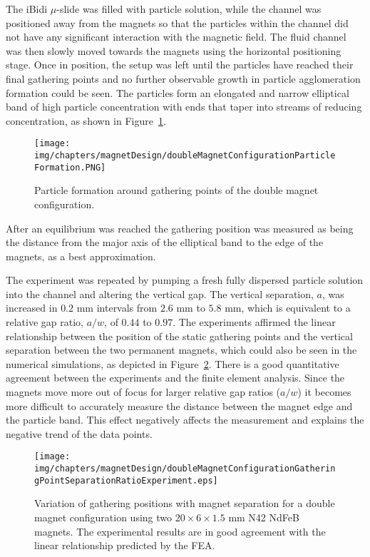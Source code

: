 The iBidi $\mu$-slide was filled with particle solution, while the channel was positioned away from the magnets so that the particles within the channel did not have any significant interaction with the magnetic field. The fluid channel was then slowly moved towards the magnets using the horizontal positioning stage. Once in position, the setup was left until the particles have reached their final gathering points and no further observable growth in particle agglomeration formation could be seen. The particles form an elongated and narrow elliptical band of high particle concentration with ends that taper into streams of reducing concentration, as shown in Figure~\ref{fig:doubleMagnetConfigurationParticleFormation}.

\begin{figure}[htb]%
\centering
	\texttt{[image: img/chapters/magnetDesign/doubleMagnetConfigurationParticleFormation.PNG]}
\caption[Particle formation around gathering points]{Particle formation around gathering points of the double magnet configuration.}
\label{fig:doubleMagnetConfigurationParticleFormation}
\end{figure}

After an equilibrium was reached the gathering position was measured as being the distance from the major axis of the elliptical band to the edge of the magnets, as a best approximation.

The experiment was repeated by pumping a fresh fully dispersed particle solution into the channel and altering the vertical gap. The vertical separation, $a$, was increased in $0.2$ mm intervals from $2.6$ mm to $5.8$ mm, which is equivalent to a relative gap ratio, $a/w$, of $0.44$ to $0.97$. The experiments affirmed the linear relationship between the position of the static gathering points and the vertical separation between the two permanent magnets, which could also be seen in the numerical simulations, as depicted in Figure~\ref{fig:doubleMagnetConfigurationGatheringPointSeparationRatioExperiment}. There is a good quantitative agreement between the experiments and the finite element analysis. Since the magnets move more out of focus for larger relative gap ratios ($a/w$) it becomes more difficult to accurately measure the distance between the magnet edge and the particle band. This effect negatively affects the measurement and explains the negative trend of the data points. 

\begin{figure}[htb]%
\centering
	\texttt{[image: img/chapters/magnetDesign/doubleMagnetConfigurationGatheringPointSeparationRatioExperiment.eps]}
\caption[Experimentally found position of the gathering points for the double magnet configuration]{Variation of gathering positions with magnet separation for a double magnet configuration using two $20 \times 6 \times 1.5$ mm N42 NdFeB magnets. The experimental results are in good agreement with the linear relationship predicted by the FEA.}
\label{fig:doubleMagnetConfigurationGatheringPointSeparationRatioExperiment}
\end{figure}

